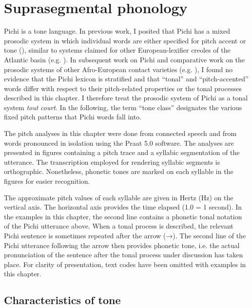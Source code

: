 \chapter{Suprasegmental phonology}

Pichi is a tone language. In previous work, I posited that Pichi has a mixed prosodic system in which individual words are either specified for pitch accent or tone (\citealt{Yakpo2009a,Yakpo2009b}), similar to systems claimed for other European-lexifier creoles of the Atlantic basin (e.g. \citealt{Rountree1972,Alleyne1980,Devonish1989,Devonish2002,Good2004,Castillo1998,CastilloFaraclas2006}). In subsequent work on Pichi and comparative work on the prosodic systems of other Afro-European contact varieties (e.g. \citealt{SteienYakpo2017}), I found no evidence that the Pichi lexicon is stratified and that “tonal” and “pitch-accented” words differ with respect to their pitch-related properties or the tonal processes described in this chapter. I therefore treat the prosodic system of Pichi as a tonal system \textit{tout} \textit{court}. In the following, the term “tone class” designates the various fixed pitch patterns that Pichi words fall into. 


The pitch analyses in this chapter were done from connected speech and from words pronounced in isolation using the Praat 5.0 software. The analyses are presented in figures containing a pitch trace and a syllabic segmentation of the utterance. The transcription employed for rendering syllabic segments is orthographic. Nonetheless, phonetic tones are marked on each syllable in the figures for easier recognition.



The approximate pitch values of each syllable are given in Hertz (Hz) on the vertical axis. The horizontal axis provides the time elapsed (1.0 = 1 second). In  the examples in this chapter, the second line contains a phonetic tonal notation of the Pichi utterance above. When a tonal process is described, the relevant Pichi sentence is sometimes repeated after the arrow (→). The second line of the Pichi utterance following the arrow then provides phonetic tone, i.e. the actual pronunciation of the sentence after the tonal process under discussion has taken place. For clarity of presentation, text codes have been omitted with examples in this chapter.


\section{Characteristics of tone}\label{sec:3.1}

